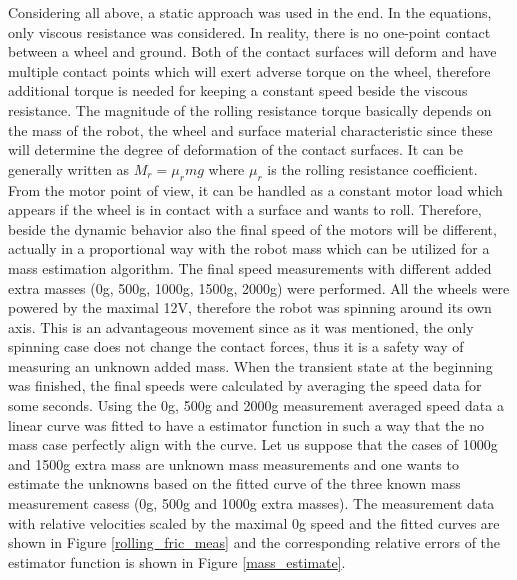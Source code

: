\documentclass[12pt,english,twoside]{article}
\begin{document}
Considering all above, a static approach was used in the end. In the equations, only viscous resistance was considered. In reality, there is no one-point contact between a wheel and ground. Both of the contact surfaces will deform and have multiple contact points which will exert adverse torque on the wheel, therefore additional torque is needed for keeping a constant speed beside the viscous resistance. The magnitude of the rolling resistance torque basically depends on the mass of the robot, the wheel and surface material characteristic since these will determine the degree of deformation of the contact surfaces. It can be generally written as $M_r = \mu_r m g$ where $\mu_r$ is the rolling resistance coefficient. From the motor point of view, it can be handled as a constant motor load which appears if the wheel is in contact with a surface and wants to roll. Therefore, beside the dynamic behavior also the final speed of the motors will be different, actually in a proportional way with the robot mass which can be utilized for a mass estimation algorithm.
The final speed measurements with different added extra masses (0g, 500g, 1000g, 1500g, 2000g) were performed. All the wheels were powered by the maximal 12V, therefore the robot was spinning around its own axis. This is an advantageous movement since as it was mentioned, the only spinning case does not change the contact forces, thus it is a safety way of measuring an unknown added mass. When the transient state at the beginning was finished, the final speeds were calculated by averaging the speed data for some seconds. Using the 0g, 500g and 2000g measurement averaged speed data a linear curve was fitted to have a estimator function in such a way that the no mass case perfectly align with the curve. Let us suppose that the cases of 1000g and 1500g extra mass are unknown mass measurements and one wants to estimate the unknowns based on the fitted curve of the three known mass measurement casess (0g, 500g and 1000g extra masses). The measurement data with relative velocities scaled by the maximal 0g speed and the fitted curves are shown in Figure \ref{rolling_fric_meas} and the corresponding relative errors of the estimator function is shown in Figure \ref{mass_estimate}.
\end{document}
